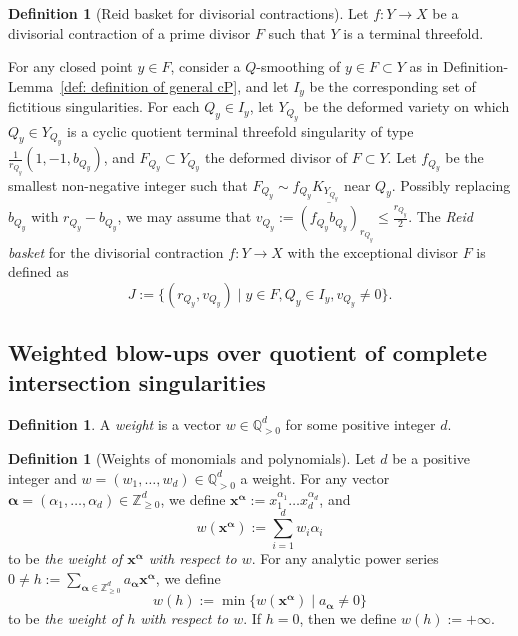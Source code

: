 \documentclass[11pt]{amsart}
\numberwithin{equation}{section}
\newcommand\luo[1]{\todo[color=red!40]{#1}} %
\newcommand{\Zz}{\mathbb{Z}}
\theoremstyle{definition}
\theoremstyle{definition}
\newtheorem{defn}[thm]{Definition}
\begin{document}
\begin{defn}[Reid basket for divisorial contractions]\label{def: Reid basket for divisorial contractions}
Let $f: Y\to X$ be a divisorial contraction of a prime divisor $F$ such that $Y$ is a terminal threefold.


For any closed point $y\in F$, consider a $Q$-smoothing of $y\in F\subset Y$ as in Definition-Lemma~\ref{def: definition of general cP}, and let $I_y$ be the corresponding set of fictitious singularities. For each $Q_y\in I_y$, let $Y_{Q_y}$ be the deformed variety on which $Q_y\in Y_{Q_y}$ is a cyclic quotient terminal threefold singularity of type $\frac{1}{r_{Q_y}}(1,-1,b_{Q_y})$, and $F_{Q_y}\subset Y_{Q_y}$ the deformed divisor of $F\subset Y$. Let $f_{Q_y}$ be the smallest non-negative integer such that $F_{Q_y}\sim f_{Q_y}K_{Y_{Q_y}}$ near $Q_y$. Possibly replacing $b_{Q_y}$ with $r_{Q_y}-b_{Q_y}$, we may assume that $v_{Q_y}:=\overline{(f_{Q_y}b_{Q_y})}_{r_{Q_y}}\leq \frac{r_{Q_y}}{2}$. The \emph{Reid basket} for the divisorial contraction $f:Y\to X$ with the exceptional divisor $F$ is defined as $$J:=\{(r_{Q_y},v_{Q_y})\mid y\in F, Q_y\in I_y, v_{Q_y}\neq 0\}.$$
\end{defn}



\subsection{Weighted blow-ups over quotient of complete intersection singularities}


\begin{defn}
A \emph{weight} is a vector $w\in\mathbb Q_{>0}^d$ for some positive integer $d$.%
\end{defn}


\begin{defn}[Weights of monomials and polynomials]
Let $d$ be a positive integer and $w=(w_1,\dots,w_d)\in \mathbb{Q}^d_{>0}$ a weight. For any vector $\bm{\alpha}=(\alpha_1,\dots, \alpha_d)\in \Zz_{\geq 0}^d$, we define $\bm{x}^{\bm{\alpha}} :=x_1^{\alpha_1}\dots x_d^{\alpha_d}$, and $$w(\bm{x}^{\bm{\alpha}}):=\sum_{i=1}^dw_i\alpha_i$$
to be \emph{the weight of $\bm{x}^{\bm{\alpha}}$ with respect to $w$}.
For any analytic power series $0\neq h:=\sum_{\bm{\alpha}\in \Zz^d_{\geq 0}} a_{\bm{\alpha}}\bm{x}^{\bm{\alpha}}$, we define $$w(h):=\min\{w(\bm{x}^{\bm{\alpha}})\mid a_{\bm{\alpha}}\neq 0\}$$
to be \emph{the weight of $h$ with respect to $w$}. If $h=0$, then we define $w(h):=+\infty$.
\end{defn}
\end{document}
